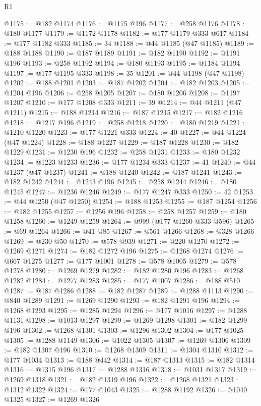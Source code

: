 \begin{lexlean}{R1}
\begin{coremodule}
@1175 := @182 @1174
@1176 := @1175 @196
@1177 := @258 @1176
@1178 := @180 @1177
@1179 := @1172 @1178
@1182 := @177 @1179 @333 @617
@1184 := @177 @1182 @333
@1185 := 34
@1188 := @44 @1185 (@47 @1185)
@1189 := @188 @1188
@1190 := @187 @1189
@1191 := @182 @1190
@1192 := @1191 @196
@1193 := @258 @1192
@1194 := @180 @1193
@1195 := @1184 @1194
@1197 := @177 @1195 @333
@1198 := 35
@1201 := @44 @1198 (@47 @1198)
@1202 := @188 @1201
@1203 := @187 @1202
@1204 := @182 @1203
@1205 := @1204 @196
@1206 := @258 @1205
@1207 := @180 @1206
@1208 := @1197 @1207
@1210 := @177 @1208 @333
@1211 := 39
@1214 := @44 @1211 (@47 @1211)
@1215 := @188 @1214
@1216 := @187 @1215
@1217 := @182 @1216
@1218 := @1217 @196
@1219 := @258 @1218
@1220 := @180 @1219
@1221 := @1210 @1220
@1223 := @177 @1221 @333
@1224 := 40
@1227 := @44 @1224 (@47 @1224)
@1228 := @188 @1227
@1229 := @187 @1228
@1230 := @182 @1229
@1231 := @1230 @196
@1232 := @258 @1231
@1233 := @180 @1232
@1234 := @1223 @1233
@1236 := @177 @1234 @333
@1237 := 41
@1240 := @44 @1237 (@47 @1237)
@1241 := @188 @1240
@1242 := @187 @1241
@1243 := @182 @1242
@1244 := @1243 @196
@1245 := @258 @1244
@1246 := @180 @1245
@1247 := @1236 @1246
@1249 := @177 @1247 @333
@1250 := 42
@1253 := @44 @1250 (@47 @1250)
@1254 := @188 @1253
@1255 := @187 @1254
@1256 := @182 @1255
@1257 := @1256 @196
@1258 := @258 @1257
@1259 := @180 @1258
@1260 := @1249 @1259
@1264 := @999 (@177 @1260 @333 @596)
@1265 := @69 @1264
@1266 := @41 @85
@1267 := @561 @1266
@1268 := @328 @1266
@1269 := @230 @50
@1270 := @578 @939
@1271 := @220 @1270
@1272 := @1269 @1271
@1274 := @182 @1272 @196
@1275 := @1268 @1274
@1276 := @667 @1275
@1277 := @177 @1001
@1278 := @578 @1005
@1279 := @578 @1278
@1280 := @1269 @1279
@1282 := @182 @1280 @196
@1283 := @1268 @1282
@1284 := @1277 @1283
@1285 := @177 @1007
@1286 := @188 @510
@1287 := @187 @1286
@1288 := @182 @1287
@1289 := @1288 @1113
@1290 := @840 @1289
@1291 := @1269 @1290
@1293 := @182 @1291 @196
@1294 := @1268 @1293
@1295 := @1285 @1294
@1296 := @177 @1016
@1297 := @1288 @1131
@1298 := @1013 @1297
@1299 := @1269 @1298
@1301 := @182 @1299 @196
@1302 := @1268 @1301
@1303 := @1296 @1302
@1304 := @177 @1025
@1305 := @1288 @1149
@1306 := @1022 @1305
@1307 := @1269 @1306
@1309 := @182 @1307 @196
@1310 := @1268 @1309
@1311 := @1304 @1310
@1312 := @177 @1034
@1313 := @188 @442
@1314 := @187 @1313
@1315 := @182 @1314
@1316 := @1315 @196
@1317 := @1288 @1316
@1318 := @1031 @1317
@1319 := @1269 @1318
@1321 := @182 @1319 @196
@1322 := @1268 @1321
@1323 := @1312 @1322
@1324 := @177 @1043
@1325 := @1288 @1192
@1326 := @1040 @1325
@1327 := @1269 @1326

\end{coremodule}
\end{lexlean}
